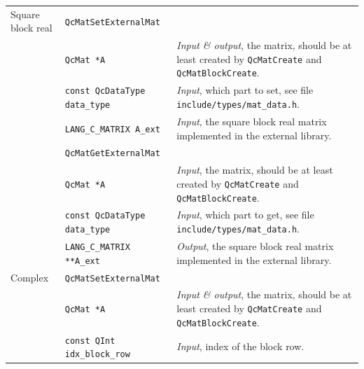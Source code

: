 \documentclass[a4paper,11pt,twoside,openright]{book}
\begin{document}
\begin{center}
\begin{longtable}{p{}|l|p{}}
    Square block real & \verb|QcMatSetExternalMat| &\\
    & \hspace*{2ex}\verb|QcMat *A| & \textsl{Input \& output}, the matrix,
      should be at least created by \verb|QcMatCreate| and \verb|QcMatBlockCreate|.\\
    & \hspace*{2ex}\verb|const QcDataType data_type| & \textsl{Input}, which part
      to set, see file \verb|include/types/mat_data.h|.\\
    & \hspace*{2ex}\verb|LANG_C_MATRIX A_ext| & \textsl{Input}, the square
      block real matrix implemented in the external library.\\
    \cline{2-3}
    & \verb|QcMatGetExternalMat| &\\
    & \hspace*{2ex}\verb|QcMat *A| & \textsl{Input}, the matrix,
      should be at least created by \verb|QcMatCreate| and \verb|QcMatBlockCreate|.\\
    & \hspace*{2ex}\verb|const QcDataType data_type| & \textsl{Input}, which part
      to get, see file \verb|include/types/mat_data.h|.\\
    & \hspace*{2ex}\verb|LANG_C_MATRIX **A_ext| & \textsl{Output}, the square
      block real matrix implemented in the external library.\\
    \hline
    Complex & \verb|QcMatSetExternalMat| &\\
    & \hspace*{2ex}\verb|QcMat *A| & \textsl{Input \& output}, the matrix,
      should be at least created by \verb|QcMatCreate| and \verb|QcMatBlockCreate|.\\
    & \hspace*{2ex}\verb|const QInt idx_block_row| & \textsl{Input},
      index of the block row.\\

\end{longtable}
\end{center}
\end{document}
